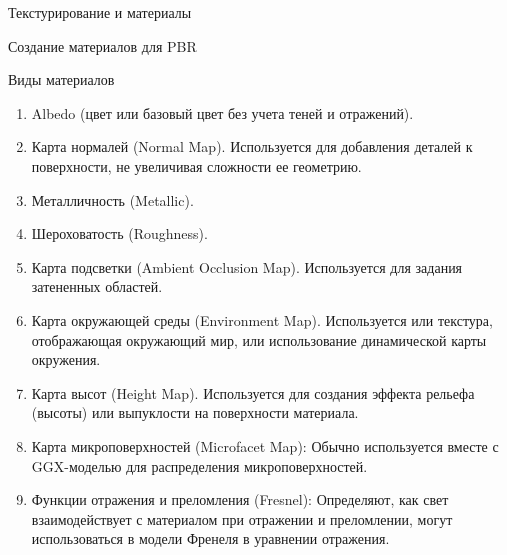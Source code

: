 \documentclass{beamer}
\begin{document}
\begin{frame}{Текстурирование и материалы}
	\end{frame}

	\begin{frame}{Создание материалов для PBR}
		
		
		{
			\footnotesize
		Виды материалов

		\begin{enumerate}
			\item 
			Albedo (цвет или базовый цвет без учета теней и отражений).
			\item 
			Карта нормалей (Normal Map).
					Используется для добавления деталей к поверхности, не увеличивая сложности ее геометрию. 
			\item 
			Металличность (Metallic).
			\item 
			Шероховатость (Roughness).
			\item 
			Карта подсветки (Ambient Occlusion Map).
					Используется для задания затененных областей.
			\item 
					Карта окружающей среды (Environment Map).
							Используется или текстура, отображающая окружающий мир, или использование динамической карты окружения.
			\item
			Карта высот (Height Map).
					Используется для создания эффекта рельефа (высоты) или выпуклости на поверхности материала.
			\item
				Карта микроповерхностей (Microfacet Map):
				Обычно используется вместе с GGX-моделью для распределения микроповерхностей.
			\item
			Функции отражения и преломления (Fresnel):
			    Определяют, как свет взаимодействует с материалом при отражении и преломлении, могут использоваться в модели Френеля в уравнении отражения.
		\end{enumerate}
		
		}
		
	\end{frame}
\end{document}
